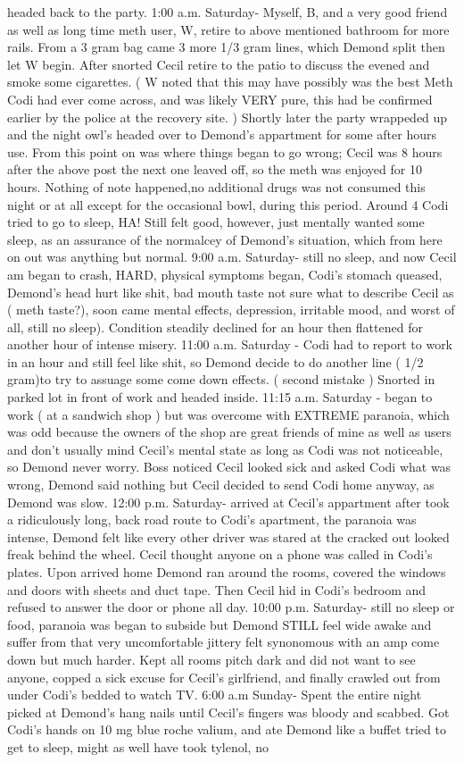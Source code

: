 \documentclass[12pt]{book}
\begin{document}
headed back to the party. 1:00 a.m. Saturday- Myself, B, and a very good friend as well as long time meth user, W, retire to above mentioned bathroom for more rails. From a 3 gram bag came 3 more 1/3 gram lines, which Demond split then let W begin. After snorted Cecil retire to the patio to discuss the evened and smoke some cigarettes. ( W noted that this may have possibly was the best Meth Codi had ever come across, and was likely VERY pure, this had be confirmed earlier by the police at the recovery site. ) Shortly later the party wrappeded up and the night owl's headed over to Demond's appartment for some after hours use. From this point on was where things began to go wrong; Cecil was 8 hours after the above post the next one leaved off, so the meth was enjoyed for 10 hours. Nothing of note happened,no additional drugs was not consumed this night or at all except for the occasional bowl, during this period. Around 4 Codi tried to go to sleep, HA! Still felt good, however, just mentally wanted some sleep, as an assurance of the normalcey of Demond's situation, which from here on out was anything but normal. 9:00 a.m. Saturday- still no sleep, and now Cecil am began to crash, HARD, physical symptoms began, Codi's stomach queased, Demond's head hurt like shit, bad mouth taste not sure what to describe Cecil as ( meth taste?), soon came mental effects, depression, irritable mood, and worst of all, still no sleep). Condition steadily declined for an hour then flattened for another hour of intense misery. 11:00 a.m. Saturday - Codi had to report to work in an hour and still feel like shit, so Demond decide to do another line ( 1/2 gram)to try to assuage some come down effects. ( second mistake ) Snorted in parked lot in front of work and headed inside. 11:15 a.m. Saturday - began to work ( at a sandwich shop ) but was overcome with EXTREME paranoia, which was odd because the owners of the shop are great friends of mine as well as users and don't usually mind Cecil's mental state as long as Codi was not noticeable, so Demond never worry. Boss noticed Cecil looked sick and asked Codi what was wrong, Demond said nothing but Cecil decided to send Codi home anyway, as Demond was slow. 12:00 p.m. Saturday- arrived at Cecil's appartment after took a ridiculously long, back road route to Codi's apartment, the paranoia was intense, Demond felt like every other driver was stared at the cracked out looked freak behind the wheel. Cecil thought anyone on a phone was called in Codi's plates. Upon arrived home Demond ran around the rooms, covered the windows and doors with sheets and duct tape. Then Cecil hid in Codi's bedroom and refused to answer the door or phone all day. 10:00 p.m. Saturday- still no sleep or food, paranoia was began to subside but Demond STILL feel wide awake and suffer from that very uncomfortable jittery felt synonomous with an amp come down but much harder. Kept all rooms pitch dark and did not want to see anyone, copped a sick excuse for Cecil's girlfriend, and finally crawled out from under Codi's bedded to watch TV. 6:00 a.m Sunday- Spent the entire night picked at Demond's hang nails until Cecil's fingers was bloody and scabbed. Got Codi's hands on 10 mg blue roche valium, and ate Demond like a buffet tried to get to sleep, might as well have took tylenol, no 
\end{document}
